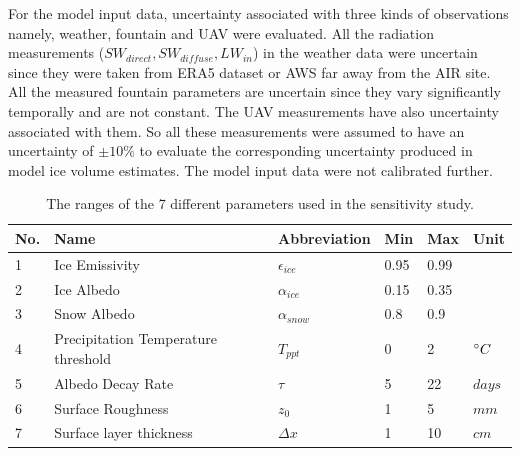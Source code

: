 \documentclass[utf8]{frontiersSCNS} %
\begin{document}
For the model input data, uncertainty associated with three kinds of observations namely, weather, fountain and UAV were
evaluated. All the radiation measurements ($SW_{direct}, SW_{diffuse}, LW_{in}$) in the weather data were uncertain
since they were taken from ERA5 dataset or AWS far away from the AIR site. All the measured fountain parameters are
uncertain since they vary significantly temporally and are not constant. The UAV measurements have also uncertainty
associated with them. So all these measurements were assumed to have an uncertainty of $\pm 10 \%$ to evaluate the
corresponding uncertainty produced in model ice volume estimates. The model input data were not calibrated further.

\begin{table}
	\centering
	\caption{The ranges of the 7 different parameters used in the sensitivity study.}
	\label{tab:parameters}
	\begin{tabular}{@{}llllll@{}}
		\toprule
		\textbf{No.} & \textbf{Name}                       & \textbf{Abbreviation} & \textbf{Min} & \textbf{Max} & \textbf{Unit} \\\midrule
		1            & Ice Emissivity                      & $\epsilon_{ice}$      & 0.95         & 0.99         &               \\
		2            & Ice Albedo                          & $\alpha_{ice}$        & 0.15         & 0.35         &               \\
		3            & Snow Albedo                         & $\alpha_{snow}$       & 0.8          & 0.9          &               \\
		4            & Precipitation Temperature threshold & $T_{ppt}$             & 0            & 2            & $\degree C$   \\
		5            & Albedo Decay Rate                   & $\tau$                & 5            & 22           & $days$        \\
		6            & Surface Roughness                   & $z_0$                 & 1            & 5            & $mm$          \\
		7            & Surface layer thickness             & $\Delta x$            & 1            & 10           & $cm$          \\\bottomrule
	\end{tabular}
\end{table}
\end{document}
